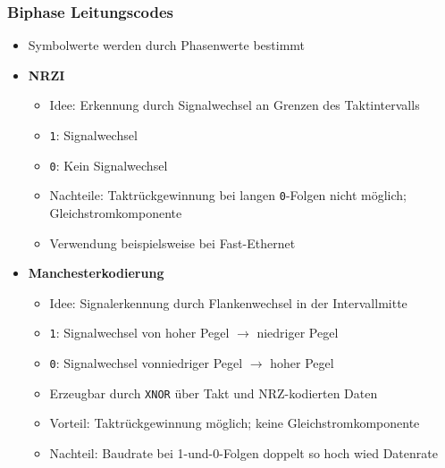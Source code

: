\subsubsection{Biphase Leitungscodes}
\begin{itemize}
	\item Symbolwerte werden durch Phasenwerte bestimmt
	\item \textbf{NRZI}
	\begin{itemize}
		\item Idee: Erkennung durch Signalwechsel an Grenzen des Taktintervalls
		\item \texttt{1}: Signalwechsel
		\item \texttt{0}: Kein Signalwechsel
		\item Nachteile: Taktrückgewinnung bei langen \texttt{0}-Folgen nicht möglich; Gleichstromkomponente
		\item Verwendung beispielsweise bei Fast-Ethernet
	\end{itemize}
	\item \textbf{Manchesterkodierung}
	\begin{itemize}
		\item Idee: Signalerkennung durch Flankenwechsel in der Intervallmitte
		\item \texttt{1}: Signalwechsel von hoher Pegel \(\rightarrow\) niedriger Pegel
		\item \texttt{0}: Signalwechsel  vonniedriger Pegel \(\rightarrow\) hoher Pegel
		\item Erzeugbar durch \texttt{XNOR} über Takt und NRZ-kodierten Daten
		\item Vorteil: Taktrückgewinnung möglich; keine Gleichstromkomponente
		\item Nachteil: Baudrate bei 1-und-0-Folgen doppelt so hoch wied Datenrate
	\end{itemize}
\end{itemize}

